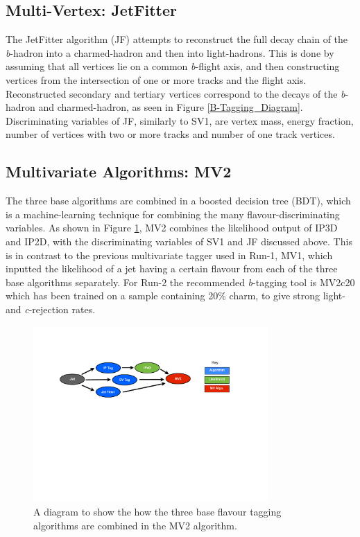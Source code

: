\documentclass[12pt, onecolumn,notitlepage]{article}
\begin{document}
\subsection{Multi-Vertex: JetFitter}  \label{ss_Algos_JF}

The JetFitter algorithm (JF) attempts to reconstruct the full decay chain of the \textit{b}-hadron into a charmed-hadron and then into light-hadrons. 
This is done by assuming that all vertices lie on a common \textit{b}-flight axis, and then constructing vertices from the intersection of
one or more tracks and the flight axis.
Reconstructed secondary and tertiary vertices correspond to the decays of the \textit{b}-hadron and charmed-hadron, as seen in Figure \ref{B-Tagging_Diagram}.
Discriminating variables of JF, similarly to SV1, are vertex mass, energy fraction, number of vertices with two or more tracks and number of one track vertices.

\subsection{Multivariate Algorithms: MV2}  \label{ss_Algos_MV2}

The three base algorithms are combined in a boosted decision tree (BDT), which is a machine-learning technique for combining the many flavour-discriminating variables.
As shown in Figure \ref{MV2_Diagram}, MV2 combines the likelihood output of IP3D and IP2D, with the discriminating variables of SV1 and JF discussed above.
This is in contrast to the previous multivariate tagger used in Run-1, MV1, which inputted
the likelihood of a jet having a certain flavour from each of the three base algorithms separately.
For Run-2 the recommended \textit{b}-tagging tool is MV2c20 which has been trained on a sample containing 20\% charm, to give strong light- and \textit{c}-rejection rates.
 
\begin{figure}[!htb]
  \begin{center}
    \includegraphics[width=0.8\textwidth]{MV2_h.pdf}
    \caption{A diagram to show the how the three base flavour tagging algorithms are combined in the MV2 algorithm.}
    \label{MV2_Diagram}
  \end{center}
  \vspace{-1cm}
\end{figure}
\end{document}
